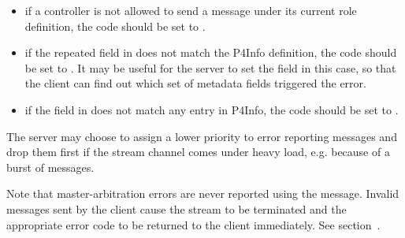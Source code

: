 \documentclass[11pt]{article}
\begin{document}
{%
\begin{itemize}[noitemsep,topsep=\mdcompacttopsep]%

\item{}if a controller is not allowed to send a  message under its
current role definition, the code should be set to .%

\item{}if the  repeated field in  does not match the P4Info
definition, the code should be set to . It may be useful
for the server to set the  field in this case, so that the client
can find out which set of metadata fields triggered the error.%

\item{}if the  field in  does not match any  entry
in P4Info, the code should be set to .%
\end{itemize}%

\noindent{}The server may choose to assign a lower priority to error reporting messages and
drop them first if the stream channel comes under heavy load, e.g. because of a
burst of  messages.%

Note that master-arbitration errors are never reported using the 
message. Invalid  messages sent by the client cause the
stream to be terminated and the appropriate error code to be returned to the
client immediately. See section~.%

}
\end{document}
